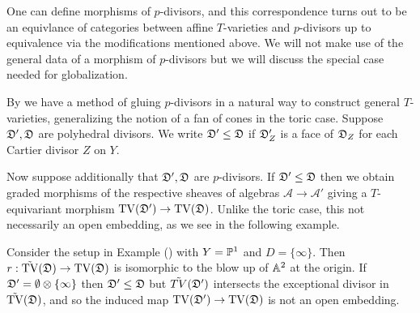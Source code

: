 One can define morphisms of \(p\)-divisors, and this correspondence turns out to be an equivlance of categories between affine \(T\)-varieties and \(p\)-divisors up to equivalence via the modifications mentioned above. We will not make use of the general data of a morphism of \(p\)-divisors but we will discuss the special case needed for globalization.

By \cite{altmann2008gluing} we have a method of gluing \(p\)-divisors in a natural way to construct general \(T\)-varieties, generalizing the notion of a fan of cones in the toric case. Suppose \({\mathfrak{D}}',{\mathfrak{D}}\) are polyhedral divisors. We write \({\mathfrak{D}}' \le {\mathfrak{D}}\) if \({\mathfrak{D}}_Z'\) is a face of \({\mathfrak{D}}_Z\) for each Cartier divisor \(Z\) on \(Y\).

Now suppose additionally that \({\mathfrak{D}}',{\mathfrak{D}}\) are \(p\)-divisors. If \({\mathfrak{D}}' \le {\mathfrak{D}}\) then we obtain graded morphisms of the respective sheaves of algebras \(\mathcal{A} \to \mathcal{A}'\) giving a \(T\)-equivariant morphism \(\operatorname{TV}({\mathfrak{D}}') \to \operatorname{TV}({\mathfrak{D}})\). Unlike the toric case, this not necessarily an open embedding, as we see in the following example.
\begin{example}
Consider the setup in Example () with \(Y = \mathbb{P}^1\) and \(D = \{\infty\}\). Then \(r: \tilde{\operatorname{TV}}({\mathfrak{D}}) \to \operatorname{TV}({\mathfrak{D}})\) is isomorphic to the blow up of \(\mathbb{A}^2\) at the origin. If \({\mathfrak{D}}' = \emptyset \otimes \{\infty\}\) then \({\mathfrak{D}}' \le {\mathfrak{D}}\) but \(\tilde{TV}({\mathfrak{D}}')\) intersects the exceptional divisor in \(\tilde{\operatorname{TV}}({\mathfrak{D}})\), and so the induced map \(\operatorname{TV}({\mathfrak{D}}') \to \operatorname{TV}({\mathfrak{D}})\) is not an open embedding.
\end{example}
